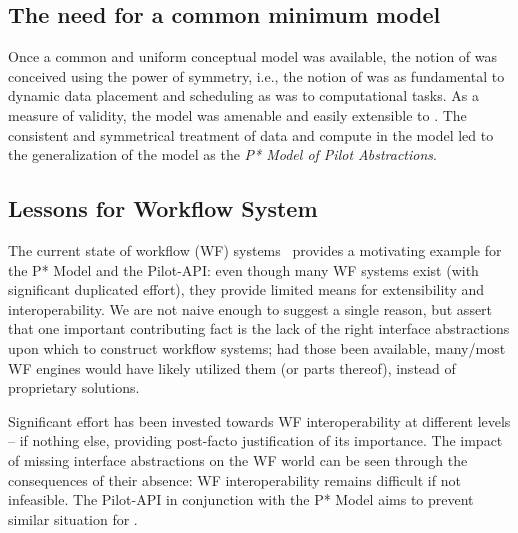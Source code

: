 \documentclass{sig-alternate}
\begin{document}
\subsection{The need for a common minimum model}


Once a common and uniform conceptual model was available, the notion
of \pilotdata was conceived using the power of symmetry, i.e., the
notion of \pilotdata was as fundamental to dynamic data placement and
scheduling as \pilotjobs was to computational tasks. As a measure of
validity, the \pstar model was amenable and easily extensible to
\pilotdata.  The consistent and symmetrical treatment of data and
compute in the model led to the generalization of the model as the
{\it P* Model of Pilot Abstractions}.


\subsection{Lessons for Workflow System}

The current state of workflow (WF) systems~\cite{nsf-workflow,1196459}
provides a motivating example for the P* Model and the Pilot-API: even
though many WF systems exist (with significant duplicated effort),
they provide limited means for extensibility and interoperability.  We
are not naive enough to suggest a single reason, but assert that one
important contributing fact is the lack of the right interface
abstractions upon which to construct workflow systems; had those been
available, many/most WF engines would have likely utilized them (or
parts thereof), instead of proprietary solutions.


Significant effort has been invested towards WF interoperability at
different levels -- if nothing else, providing post-facto
justification of its importance. The impact of missing interface
abstractions on the WF world can be seen through the consequences of
their absence: WF interoperability remains difficult if not
infeasible. The Pilot-API in conjunction with the P* Model aims to
prevent similar situation for \pilotjobs.

\end{document}
